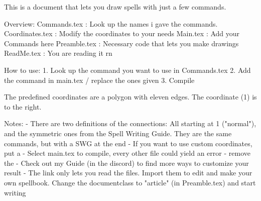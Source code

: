 

This is a document that lets you draw spells with just a few commands.

Overview:
    Commands.tex :      Look up the names i gave the commands.
    Coordinates.tex :   Modify the coordinates to your needs
    Main.tex :          Add your Commands here
    Preamble.tex :      Necessary code that lets you make drawings
    ReadMe.tex :        You are reading it rn

How to use:
    1. Look up the command you want to use in Commands.tex
    2. Add the command in main.tex / replace the ones given
    3. Compile

The predefined coordinates are a polygon with eleven edges. The coordinate (1) is to the right.

Notes:
    - There are two definitions of the connections: All starting at 1 ("normal"), and the symmetric ones from the Spell Writing Guide. They are the same commands, but with a SWG at the end
    - If you want to use custom coordinates, put a %
    - Select main.tex to compile, every other file could yield an error
    - remove the %
    - Check out my Guide (in the discord) to find more ways to customize your result
    - The link only lets you read the files. Import them to edit and make your own spellbook. Change the documentclass to "article" (in Preamble.tex) and start writing
    